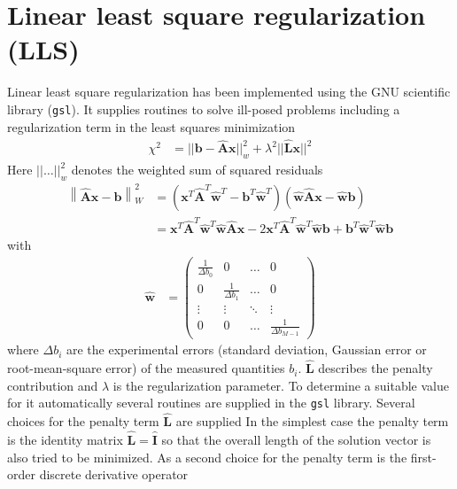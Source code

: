 \section{Linear least square regularization (LLS)}
\label{sec:LLS}
Linear least square regularization has been implemented using the GNU scientific library (\texttt{gsl}). It supplies routines to solve ill-posed problems including a regularization term in the least squares minimization
\begin{align}\label{eq:LLSreg}
  \chi^2 &= || \mathbf{b} - \hat{\mathbf{A}}\mathbf{x} ||_{w}^2 + \lambda^2 || \hat{\mathbf{L}} \mathbf{x} ||^2
\end{align}
Here $|| \dots ||_{w}^2$ denotes the weighted sum of squared residuals
\begin{align}\label{eq:wSumSR}
\left\| \hat{\mathbf{A}}\mathbf{x}-\mathbf{b}\right\|_W^2
&= \left(\mathbf{x}^T\hat{\mathbf{A}}^T\hat{\mathbf{w}}^T-\mathbf{b}^T\hat{\mathbf{w}}^T\right)\left(\hat{\mathbf{w}}\hat{\mathbf{A}}\mathbf{x}-\hat{\mathbf{w}}\mathbf{b}\right)\\
&= \mathbf{x}^T\hat{\mathbf{A}}^T\hat{\mathbf{w}}^T\hat{\mathbf{w}}\hat{\mathbf{A}}\mathbf{x}-2 \mathbf{x}^T\hat{\mathbf{A}}^T\hat{\mathbf{w}}^T\hat{\mathbf{w}}\mathbf{b}+\mathbf{b}^T\hat{\mathbf{w}}^T\hat{\mathbf{w}}\mathbf{b}
\end{align}
with
\begin{align}
  \hat{\mathbf{w}} &=
  \begin{pmatrix}
    \frac{1}{\Delta b_0} & 0 & \dots & 0 \\
    0 & \frac{1}{\Delta b_1} & \dots & 0 \\
    \vdots & \vdots & \ddots & \vdots \\
    0 & 0 & \dots & \frac{1}{\Delta b_{M-1}}
  \end{pmatrix}
\end{align}
where $\Delta b_i$ are the experimental errors (standard deviation, Gaussian error or root-mean-square error) of the measured quantities $b_i$.
$\hat{\mathbf{L}}$ describes the penalty contribution and $\lambda$
 is the regularization parameter. To determine a suitable value for it automatically several routines are supplied in the \texttt{gsl} library. Several choices for the penalty term $\hat{\mathbf{L}}$ are supplied
 In the simplest case the penalty term is the identity matrix $\hat{\mathbf{L}} = \hat{\mathbf{I}}$ so that the overall length of the solution vector is also tried to be minimized. As a second choice for the penalty term is the first-order discrete derivative operator \cite{Donatelli2014}

